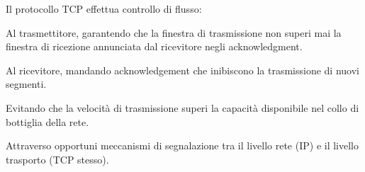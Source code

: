 \question
Il protocollo TCP effettua controllo di flusso:

\begin{checkboxes}
	\CorrectChoice Al trasmettitore, garantendo che la finestra di trasmissione non superi mai la finestra di ricezione annunciata dal ricevitore negli acknowledgment.

	\choice Al ricevitore, mandando acknowledgement che inibiscono la trasmissione di nuovi segmenti.

	\choice Evitando che la velocità di trasmissione superi la capacità disponibile nel collo di bottiglia della rete.

	\choice Attraverso opportuni meccanismi di segnalazione tra il livello rete (IP) e il livello trasporto (TCP stesso).
\end{checkboxes}
